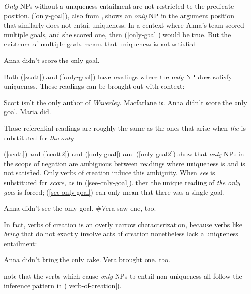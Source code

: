 \textit{Only} NPs without a uniqueness entailment are not restricted to the predicate position. (\ref{only-goal}), also from \citet{cb2015}, shows an \textit{only} NP in the argument position that similarly does not entail uniqueness. In a context where Anna's team scored multiple goals, and she scored one, then (\ref{only-goal}) would be true. But the existence of multiple goals means that uniqueness is not satisfied.

\begin{exe}
	\ex \label{only-goal} Anna didn't score the only goal.
\end{exe}

Both (\ref{scott}) and (\ref{only-goal}) have readings where the \textit{only} NP does satisfy uniqueness. These readings can be brought out with context:

\begin{exe}
	\ex \label{scott2} Scott isn't the only author of \textit{Waverley}. Macfarlane is.
	\ex \label{only-goal2} Anna didn't score the only goal. Maria did.
\end{exe}

These referential readings are roughly the same as the ones that arise when \textit{the} is substituted for \textit{the only}.

(\ref{scott}) and (\ref{scott2}) and (\ref{only-goal}) and (\ref{only-goal2}) show that \textit{only} NPs in the scope of negation are ambiguous between readings where uniqueness is and is not satisfied. Only verbs of creation induce this ambiguity. When \textit{see} is substituted for \textit{score}, as in (\ref{see-only-goal}), then the unique reading of \textit{the only goal} is forced; (\ref{see-only-goal}) can only mean that there was a single goal.

\begin{exe}
	\ex \label{see-only-goal} Anna didn't see the only goal. \#Vera saw one, too.
\end{exe}

In fact, verbs of creation is an overly narrow characterization, because verbs like \textit{bring} that do not exactly involve acts of creation nonetheless lack a uniqueness entailment:

\begin{exe}
	\ex Anna didn't bring the only cake. Vera brought one, too.
\end{exe}

\citet{cb2015} note that the verbs which cause \textit{only} NPs to entail non-uniqueness all follow the inference pattern in (\ref{verb-of-creation}).

